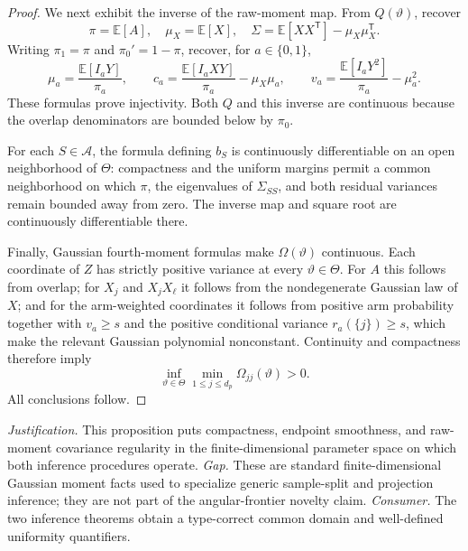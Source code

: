 \documentclass{article}
\begin{document}
\begin{proof}
We next exhibit the inverse of the raw-moment map.  From \(Q(\vartheta)\), recover
\[
 \pi=\mathbb E[A],\quad
 \mu_X=\mathbb E[X],\quad
 \Sigma=\mathbb E[XX^{\mathsf T}]-\mu_X\mu_X^{\mathsf T}.
\]
Writing \(\pi_1=\pi\) and \(\pi_0'=1-\pi\), recover, for \(a\in\{0,1\}\),
\[
 \mu_a=\frac{\mathbb E[I_aY]}{\pi_a},\qquad
 c_a=\frac{\mathbb E[I_aXY]}{\pi_a}-\mu_X\mu_a,
 \qquad
 v_a=\frac{\mathbb E[I_aY^2]}{\pi_a}-\mu_a^2.
\]
These formulas prove injectivity.  Both \(Q\) and this inverse are continuous because the overlap denominators are bounded below by \(\pi_0\).

For each \(S\in\mathcal A\), the formula defining \(b_S\) is continuously differentiable on an open neighborhood of \(\Theta\): compactness and the uniform margins permit a common neighborhood on which \(\pi\), the eigenvalues of \(\Sigma_{SS}\), and both residual variances remain bounded away from zero.  The inverse map and square root are continuously differentiable there.

Finally, Gaussian fourth-moment formulas make \(\Omega(\vartheta)\) continuous.  Each coordinate of \(Z\) has strictly positive variance at every \(\vartheta\in\Theta\).  For \(A\) this follows from overlap; for \(X_j\) and \(X_jX_\ell\) it follows from the nondegenerate Gaussian law of \(X\); and for the arm-weighted coordinates it follows from positive arm probability together with \(v_a\geq s\) and the positive conditional variance \(r_a(\{j\})\geq s\), which make the relevant Gaussian polynomial nonconstant.  Continuity and compactness therefore imply
\[
 \inf_{\vartheta\in\Theta}\min_{1\leq j\leq d_p}\Omega_{jj}(\vartheta)>0.
\]
All conclusions follow.
\end{proof}
\par\smallskip\noindent \textit{Justification.} This proposition puts compactness, endpoint smoothness, and raw-moment covariance regularity in the finite-dimensional parameter space on which both inference procedures operate. \textit{Gap.} These are standard finite-dimensional Gaussian moment facts used to specialize generic sample-split and projection inference; they are not part of the angular-frontier novelty claim. \textit{Consumer.} The two inference theorems obtain a type-correct common domain and well-defined uniformity quantifiers.
\end{document}
